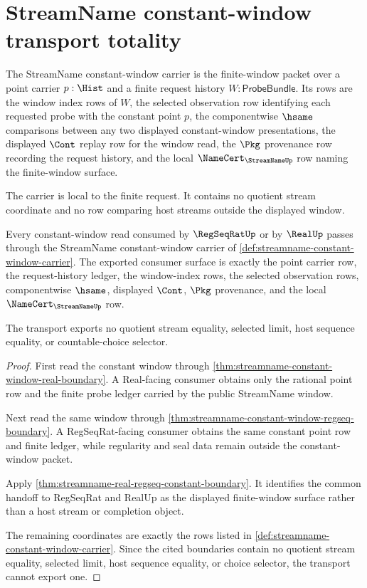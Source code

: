 \section{StreamName constant-window transport totality}
\label{sec:streamname-constant-window-transport-totality}

\begin{definition}
\label{def:streamname-constant-window-carrier}
The StreamName constant-window carrier is the finite-window packet over a point carrier $p:\Hist$ and a finite request history $W:\mathsf{ProbeBundle}$. Its rows are the window index rows of $W$, the selected observation row identifying each requested probe with the constant point $p$, the componentwise $\hsame$ comparisons between any two displayed constant-window presentations, the displayed $\Cont$ replay row for the window read, the $\Pkg$ provenance row recording the request history, and the local $\NameCert_{\StreamNameUp}$ row naming the finite-window surface.

The carrier is local to the finite request. It contains no quotient stream coordinate and no row comparing host streams outside the displayed window.
\end{definition}

\begin{theorem}
\label{thm:streamname-window-transport-totality}
Every constant-window read consumed by $\RegSeqRatUp$ or by $\RealUp$ passes through the StreamName constant-window carrier of \autoref{def:streamname-constant-window-carrier}. The exported consumer surface is exactly the point carrier row, the request-history ledger, the window-index rows, the selected observation rows, componentwise $\hsame$, displayed $\Cont$, $\Pkg$ provenance, and the local $\NameCert_{\StreamNameUp}$ row.

The transport exports no quotient stream equality, selected limit, host sequence equality, or countable-choice selector.
\end{theorem}
\begin{proof}
First read the constant window through \autoref{thm:streamname-constant-window-real-boundary}. A Real-facing consumer obtains only the rational point row and the finite probe ledger carried by the public StreamName window.

Next read the same window through \autoref{thm:streamname-constant-window-regseq-boundary}. A RegSeqRat-facing consumer obtains the same constant point row and finite ledger, while regularity and seal data remain outside the constant-window packet.

Apply \autoref{thm:streamname-real-regseq-constant-boundary}. It identifies the common handoff to RegSeqRat and RealUp as the displayed finite-window surface rather than a host stream or completion object.

The remaining coordinates are exactly the rows listed in \autoref{def:streamname-constant-window-carrier}. Since the cited boundaries contain no quotient stream equality, selected limit, host sequence equality, or choice selector, the transport cannot export one.
\end{proof}
